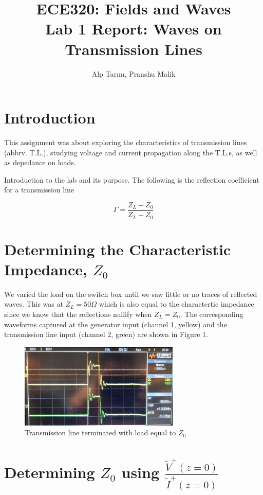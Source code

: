 \documentclass[10pt]{article}
\begin{document}
\title{\textbf{\Large{\textsc{ECE320:} Fields and Waves}} \\ \Large{Lab 1 Report: Waves on Transmission Lines}}
\author{Alp Tarım, Pranshu Malik}


\maketitle

\section{Introduction}
This assignment was about exploring the characteristics of transmission lines (abbrv. T.L.), studying voltage and current 
propagation along the T.L.s, as well as depedance on loads.

Introduction to the lab and its purpose. The following is the reflection coefficient for a transmission line

\[
    \label{reflection_coefficient}
    \Gamma = \frac{Z_L - Z_0}{Z_L + Z_0}
\]

\section{Determining the Characteristic Impedance, $Z_0$}

We varied the load on the switch box until we saw little or no traces of reflected waves.
This was at $Z_L = 50 \Omega$ which is also equal to the charactertic impedance 
since we know that the reflections nullify when $Z_L = Z_0$. The corresponding waveforms
captured at the generator input (channel 1, yellow) and the transmission line input (channel 2, green) 
are shown in Figure 1.

\begin{figure}[h]
    \centering
    \includegraphics[width=3.0in]{photos/lab1/load_matched.jpg}
    \caption{Transmission line terminated with load equal to $Z_0$}
    \label{simulationfigure}
\end{figure}

\section{Determining $Z_0$ using $\frac{\tilde V^+(z=0)}{\tilde I^+(z=0)}$}
\end{document}
